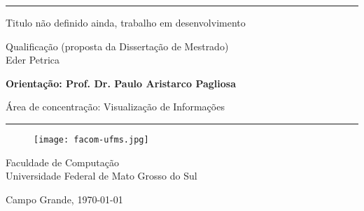 
\begin{center}
	\noindent \rule{\linewidth}{.1cm}
	
	
	{\LARGE \textsf{Titulo não definido ainda, trabalho em desenvolvimento}}
	
	\vspace*{0.5cm}
	{\Large \textsf{Qualificação (proposta da Dissertação de Mestrado)}}\\
	
	\vspace*{0.5cm}
	{\Large \textsf{Eder Petrica}}
	
	\vspace*{0.5cm}
	
	\textbf{Orientação: Prof. Dr. Paulo Aristarco Pagliosa}\\
	\vspace*{1cm}
	
	Área de concentração: Visualização de Informações\\
	\vspace*{0.5cm}
	
	\vspace*{0.5cm}
	
	\noindent \rule{\linewidth}{.1cm}
	
	\vspace*{0.5cm}
	
	\begin{figure}[htb]
		\begin{center}
			\texttt{[image: facom-ufms.jpg]}
		\end{center}
	\end{figure}
	\vspace{1 cm}
	
	{\large
		
		Faculdade de Computação \\
		Universidade Federal de Mato Grosso do Sul
		
	}
	
	Campo Grande, \today
	
\end{center}
